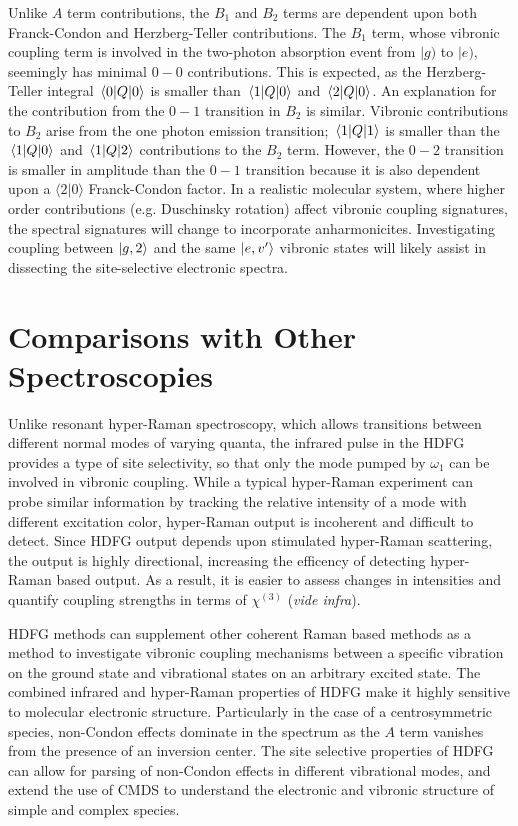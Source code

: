 \documentclass[aip, jcp, reprint, onecolumn]{revtex4-2}
\begin{document}
Unlike $A$ term contributions, the $B_1$ and $B_2$ terms are dependent upon both Franck-Condon and Herzberg-Teller contributions.
The $B_1$ term, whose vibronic coupling term is involved in the two-photon absorption event from $|g)$ to $|e)$, seemingly has minimal $0-0$ contributions. 
This is expected, as the Herzberg-Teller integral $\mel{0}{Q}{0}$ is smaller than $\mel{1}{Q}{0}$ and $\mel{2}{Q}{0}$. 
An explanation for the contribution from the $0-1$ transition in $B_2$ is similar.
Vibronic contributions to $B_2$ arise from the one photon emission transition; $\mel{1}{Q}{1}$ is smaller than the $\mel{1}{Q}{0}$ and $\mel{1}{Q}{2}$ contributions to the $B_2$ term.
However, the $0-2$ transition is smaller in amplitude than the $0-1$ transition because it is also dependent upon a $\langle 2 | 0 \rangle$ Franck-Condon factor.
In a realistic molecular system, where higher order contributions (e.g. Duschinsky rotation) affect vibronic coupling signatures, the spectral signatures will change to incorporate anharmonicites. \cite{Duschinsky1937, Carlson1990, Kundu2022}
Investigating coupling between $\ket{g,2}$ and the same $\ket{e,v'}$ vibronic states will likely assist in dissecting the site-selective electronic spectra.

\section{Comparisons with Other Spectroscopies}\label{quant}
Unlike resonant hyper-Raman spectroscopy, which allows transitions between different normal modes of varying quanta, the infrared pulse in the HDFG provides a type of site selectivity,\cite{RN103, Carlson1991} so that only the mode pumped by $\omega_1$ can be involved in vibronic coupling. 
While a typical hyper-Raman experiment can probe similar information by tracking the relative intensity of a mode with different excitation color, hyper-Raman output is incoherent and difficult to detect. \cite{Kelley2010}
Since HDFG output depends upon stimulated hyper-Raman scattering, the output is highly directional, increasing the efficency of detecting hyper-Raman based output. 
As a result, it is easier to assess changes in intensities and quantify coupling strengths in terms of $\chi^{(3)}$ (\textit{vide infra}).

HDFG methods can supplement other coherent Raman based methods as a method to investigate vibronic coupling mechanisms between a specific vibration on the ground state and vibrational states on an arbitrary excited state.\cite{RN103}
The combined infrared and hyper-Raman properties of HDFG make it highly sensitive to molecular electronic structure.
Particularly in the case of a centrosymmetric species, non-Condon effects dominate in the spectrum as the $A$ term vanishes from the presence of an inversion center.
The site selective properties of HDFG can allow for parsing of non-Condon effects in different vibrational modes, and extend the use of CMDS to understand the electronic and vibronic structure of simple and complex species.
\end{document}
